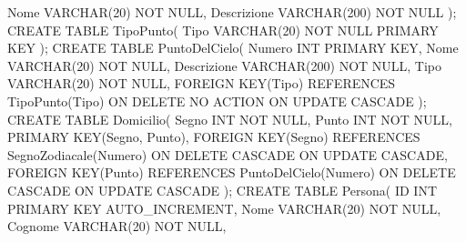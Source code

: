 \null\qquad Nome VARCHAR(20) NOT NULL,\newline
\null\qquad Descrizione VARCHAR(200) NOT NULL\newline
);\newline\newline
CREATE TABLE TipoPunto(\newline
\null\qquad Tipo VARCHAR(20) NOT NULL PRIMARY KEY\newline
);\newline\newline
CREATE TABLE PuntoDelCielo(\newline
\null\qquad Numero INT PRIMARY KEY,\newline
\null\qquad Nome VARCHAR(20) NOT NULL,\newline
\null\qquad Descrizione VARCHAR(200) NOT NULL,\newline
\null\qquad Tipo VARCHAR(20) NOT NULL,\newline
\null\qquad FOREIGN KEY(Tipo) REFERENCES TipoPunto(Tipo)\newline
\null\qquad ON DELETE NO ACTION\newline
\null\qquad ON UPDATE CASCADE\newline
);\newline\newline
CREATE TABLE Domicilio(\newline
\null\qquad Segno INT NOT NULL,\newline
\null\qquad Punto INT NOT NULL,\newline
\null\qquad PRIMARY KEY(Segno, Punto),\newline
\null\qquad FOREIGN KEY(Segno) REFERENCES SegnoZodiacale(Numero)\newline
\null\qquad ON DELETE CASCADE\newline
\null\qquad ON UPDATE CASCADE,\newline
\null\qquad FOREIGN KEY(Punto) REFERENCES PuntoDelCielo(Numero)\newline
\null\qquad ON DELETE CASCADE\newline
\null\qquad ON UPDATE CASCADE\newline
);\newline\newline
CREATE TABLE Persona(\newline
\null\qquad ID INT PRIMARY KEY AUTO\_INCREMENT,\newline
\null\qquad Nome VARCHAR(20) NOT NULL,\newline
\null\qquad Cognome VARCHAR(20) NOT NULL,\newline
